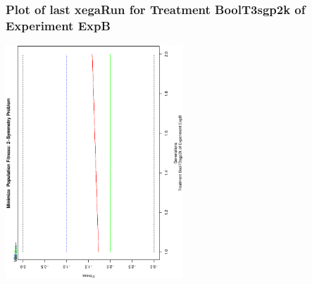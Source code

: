  \begin{frame}
 \frametitle{ Plot of last xegaRun for Treatment BoolT3sgp2k of Experiment ExpB }
 \begin{center}
\includegraphics[width=0.5\textwidth, angle=-90]
{ExpBPlotPopStatsFigure015.eps}
 \end{center}
 \label{report/ExpBPlotPopStatsFigure015.eps}  
 \end{frame}

